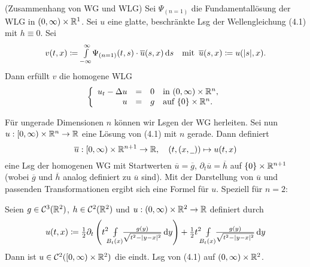 \documentclass{cheat-sheet}
\def\Xint#1{\mathchoice
   {\XXint\displaystyle\textstyle{#1}}%
   {\XXint\textstyle\scriptstyle{#1}}%
   {\XXint\scriptstyle\scriptscriptstyle{#1}}%
   {\XXint\scriptscriptstyle\scriptscriptstyle{#1}}%
   \!\int}
\def\XXint#1#2#3{{\setbox0=\hbox{$#1{#2#3}{\int}$}
     \vcenter{\hbox{$#2#3$}}\kern-.5\wd0}}
\def\dashint{\Xint-}
\newcommand{\mymvint}[2]{{\textstyle \dashint\limits_{#1}^{#2}}}
\newcommand{\MVInt}[4]{\mymvint{#1}{#2} #3 \,\d #4}
\begin{document}
\begin{bem}(Zusammenhang von WG und WLG)
  Sei $\Psi_{(n=1)}$ die Fundamentallösung der WLG in $\left( 0, \infty \right) \times \mathbb{R}^1$. Sei $u$ eine glatte, beschränkte Lsg der Wellengleichung (4.1) mit $h \equiv 0$. Sei
  \[
    v(t, x) \coloneqq {\textstyle \int\limits_{-\infty}^{\infty}} \Psi_{(n=1)}(t, s) \cdot \overline{u}(s, x) \,\mathrm{d} s
    \quad \text{mit} \enspace \overline{u}(s, x) \coloneqq u(\lvert s\rvert, x).
  \]
  Dann erfüllt $v$ die homogene WLG
  \[
    \left\{ \begin{array}{rlll}
      u_t - \Delta u &=& 0 & \text{in $\left( 0, \infty \right) \times \mathbb{R}^n$},\\
      u &=& g & \text{auf $\{ 0 \} \times \mathbb{R}^n$}.
    \end{array} \right.
  \]
\end{bem}


\begin{bem}
  Für ungerade Dimensionen $n$ können wir Lsgen der WG herleiten. Sei nun $u : \left[ 0, \infty \right) \times \mathbb{R}^n \to \mathbb{R}$ eine Lösung von (4.1) mit $n$ gerade. Dann definiert
  \[
    \overline{u} : \left[ 0, \infty \right) \times \mathbb{R}^{n+1} \to \mathbb{R}, \quad (t, (x, \underline{\,\,\,})) \mapsto u(t, x)
  \]
  eine Lsg der homogenen WG mit Startwerten $\overline{u} = \overline{g}$, $\partial_t \overline{u} = \overline{h}$ auf $\{ 0 \} \times \mathbb{R}^{n+1}$ (wobei $\overline{g}$ und $\overline{h}$ analog definiert zu $\overline{u}$ sind). Mit der Darstellung von $\overline{u}$ und passenden Transformationen ergibt sich eine Formel für $u$. Speziell für $n=2$:
\end{bem}

\begin{satz}
  Seien $g \in \mathcal{C}^3(\mathbb{R}^2)$, $h \in \mathcal{C}^2(\mathbb{R}^2)$ und $u : \left( 0, \infty \right) \times \mathbb{R}^2 \to \mathbb{R}$ definiert durch
  \[
    u(t, x) \coloneqq \tfrac{1}{2} \partial_t \left( t^2 \enspace \MVInt{\mathclap{B_t(x)}}{}{\enspace \tfrac{g(y)}{\sqrt{t^2 - \abs{y-x}^2}}}{y} \right) + \tfrac{1}{2} t^2 \enspace \MVInt{\mathclap{B_t(x)}}{}{\enspace \tfrac{g(y)}{\sqrt{t^2 - \abs{y-x}^2}}}{y}
  \]
  Dann ist $u \in \mathcal{C}^2(\left[ 0, \infty \right) \times \mathbb{R}^2)$ die eindt. Lsg von (4.1) auf $\left( 0, \infty \right) \times \mathbb{R}^2$.
\end{satz}

\end{document}
